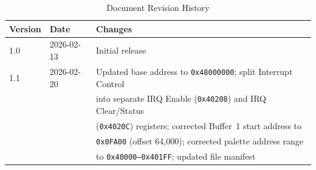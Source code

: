 \documentclass[11pt,letterpaper]{report}
\begin{document}
\begin{table}[tbp]
\centering
\caption{Document Revision History}
\label{tab:revisions}
\begin{tabular}{lll}
\toprule
\textbf{Version} & \textbf{Date} & \textbf{Changes} \\
\midrule
1.0 & 2026-02-13 & Initial release \\
1.1 & 2026-02-20 & Updated base address to \texttt{0x48000000}; split Interrupt Control \\
    &            & into separate IRQ Enable (\texttt{0x40208}) and IRQ Clear/Status \\
    &            & (\texttt{0x4020C}) registers; corrected Buffer~1 start address to \\
    &            & \texttt{0x0FA00} (offset 64,000); corrected palette address range \\
    &            & to \texttt{0x40000--0x401FF}; updated file manifest \\
\bottomrule
\end{tabular}
\end{table}
\end{document}
